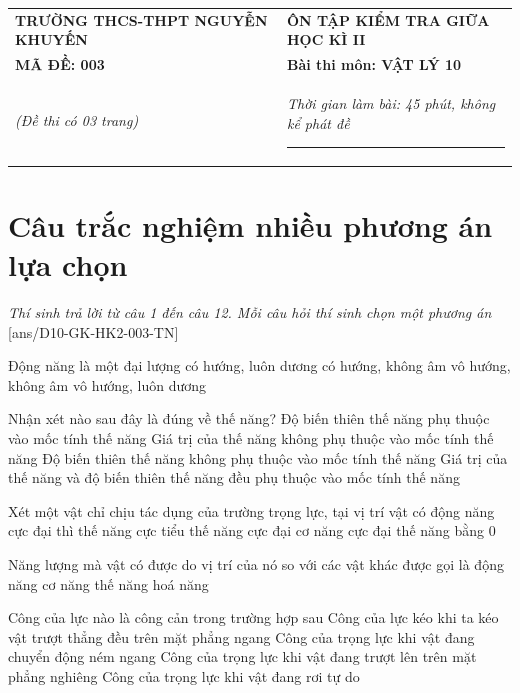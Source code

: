 \begin{center}
	\begin{tabular}{M{9.25cm}M{8.75cm}}
		\textbf{TRƯỜNG THCS-THPT NGUYỄN KHUYẾN}& \textbf{ÔN TẬP KIỂM TRA GIỮA HỌC KÌ II}\\
		\textbf{MÃ ĐỀ: 003}& \textbf{Bài thi môn: VẬT LÝ 10}\\
		\textit{(Đề thi có 03 trang)}& \textit{Thời gian làm bài: 45 phút, không kể phát đề}
		
		\noindent\rule{4cm}{0.8pt} \\
	\end{tabular}
\end{center}
\setcounter{section}{0}
\section{Câu trắc nghiệm nhiều phương án lựa chọn}
\textit{Thí sinh trả lời từ câu 1 đến câu 12. Mỗi câu hỏi thí sinh chọn một phương án}
\setcounter{ex}{0}
[ans/D10-GK-HK2-003-TN]
\begin{ex}
	Động năng là một đại lượng
	\choice
	{có hướng, luôn dương}
	{có hướng, không âm}
	{\True vô hướng, không âm}
	{vô hướng, luôn dương}
	\loigiai{}
\end{ex}
\begin{ex}
	Nhận xét nào sau đây là đúng về thế năng?
	\choice
	{Độ biến thiên thế năng phụ thuộc vào mốc tính thế năng}
	{Giá trị của thế năng không phụ thuộc vào mốc tính thế năng}
	{\True Độ biến thiên thế năng không phụ thuộc vào mốc tính thế năng}
	{Giá trị của thế năng và độ biến thiên thế năng đều phụ thuộc vào mốc tính thế năng}
	\loigiai{}
\end{ex}
\begin{ex}
	Xét một vật chỉ chịu tác dụng của trường trọng lực, tại vị trí vật có động năng cực đại thì
	\choice
	{\True thế năng cực tiểu}
	{thế năng cực đại}
	{cơ năng cực đại}
	{thế năng bằng 0}
	\loigiai{}
\end{ex}
\begin{ex}
	Năng lượng mà vật có được do vị trí của nó so với các vật khác được gọi là
	\choice
	{động năng}
	{cơ năng}
	{\True thế năng}
	{hoá năng}
	\loigiai{}
\end{ex}
\begin{ex}
	Công của lực nào là công cản trong trường hợp sau
	\choice
	{Công của lực kéo khi ta kéo vật trượt thẳng đều trên mặt phẳng ngang}
	{Công của trọng lực khi vật đang chuyển động ném ngang}
	{\True Công của trọng lực khi vật đang trượt lên trên mặt phẳng nghiêng}
	{Công của trọng lực khi vật đang rơi tự do}
	\loigiai{}
\end{ex}
